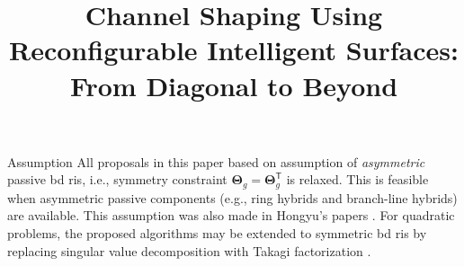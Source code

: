 \documentclass[journal]{IEEEtran}
\begin{document}
\title{Channel Shaping Using Reconfigurable Intelligent Surfaces: From Diagonal to Beyond}
\author{
}
\maketitle



\glsresetall

\begin{section}{Assumption}
	All proposals in this paper based on assumption of \emph{asymmetric} passive \gls{bd} \gls{ris}, i.e., symmetry constraint $\mathbf{\Theta}_g = \mathbf{\Theta}_g^\mathsf{T}$ is relaxed.
	This is feasible when asymmetric passive components (e.g., ring hybrids and branch-line hybrids) \cite{Ahn2006} are available.
	This assumption was also made in Hongyu's papers \cite{Li2023b,Li2023c}.
	For quadratic problems, the proposed algorithms may be extended to symmetric \gls{bd} \gls{ris} by replacing singular value decomposition with Takagi factorization \cite{Horn2012}.
\end{section}
\end{document}
